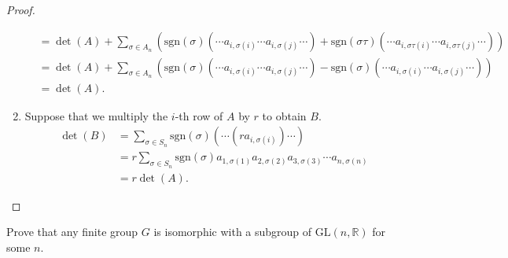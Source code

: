 \begin{proof}
\begin{enumerate}[label={\textbf{\alph*.}}]
\begin{align*}
                          & = \det(A) + \sum_{\sigma\in A_{n}}(\text{sgn}(\sigma)(\cdots a_{i,\sigma(i)}\cdots a_{i,\sigma(j)}\cdots) + \text{sgn}(\sigma\tau)(\cdots a_{i,\sigma\tau(i)}\cdots a_{i,\sigma\tau(j)}\cdots)) \\
                          & = \det(A) + \sum_{\sigma\in A_{n}}(\text{sgn}(\sigma)(\cdots a_{i,\sigma(i)}\cdots a_{i,\sigma(j)}\cdots) - \text{sgn}(\sigma)(\cdots a_{i,\sigma(i)}\cdots a_{i,\sigma(j)}\cdots))             \\
                          & = \det(A).
              \end{align*}
              \endgroup
        \item Suppose that we multiply the $i$-th row of $A$ by $r$ to obtain $B$.
              \begingroup
              \allowdisplaybreaks{}
              \begin{align*}
                  \det(B) & = \sum_{\sigma\in S_{n}}\text{sgn}(\sigma)(\cdots (ra_{i,\sigma(i)})\cdots)                                    \\
                          & = r\sum_{\sigma\in S_{n}}\text{sgn}(\sigma)a_{1,\sigma(1)}a_{2,\sigma(2)}a_{3,\sigma(3)}\cdots a_{n,\sigma(n)} \\
                          & = r\det(A).
              \end{align*}
              \endgroup
    \end{enumerate}
\end{proof}

\begin{exercise}
    Prove that any finite group $G$ is isomorphic with a subgroup of $\text{GL}(n,\mathbb{R})$ for some $n$.
\end{exercise}

